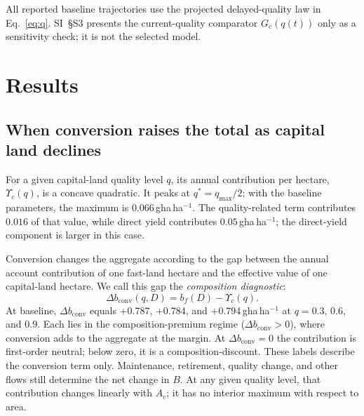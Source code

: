 \documentclass[preprint,12pt,authoryear]{elsarticle}
\newcommand{\dconv}{\Delta b_{\mathrm{conv}}}
\newcommand{\Ups}{\Upsilon_c}
\begin{document}
All reported baseline trajectories use the projected delayed-quality law in Eq.~\eqref{eq:q}. SI~\S S3 presents the current-quality comparator $G_c(q(t))$ only as a sensitivity check; it is not the selected model.
\section{Results}\label{sec:results}

\subsection{When conversion raises the total as capital land declines}\label{sec:mask}

For a given capital-land quality level $q$, its annual contribution per hectare, $\Ups(q)$, is a concave quadratic. It peaks at $q^*=q_{\max}/2$; with the baseline parameters, the maximum is $0.066$\,gha\,ha$^{-1}$. The quality-related term contributes $0.016$ of that value, while direct yield contributes $0.05$\,gha\,ha$^{-1}$; the direct-yield component is larger in this case.

Conversion changes the aggregate according to the gap between the annual account contribution of one fast-land hectare and the effective value of one capital-land hectare. We call this gap the \emph{composition diagnostic}:
\begin{equation}\label{eq:dconv}
\dconv(q,D)=b_f(D)-\Ups(q).
\end{equation}
At baseline, $\dconv$ equals $+0.787$, $+0.784$, and $+0.794$\,gha\,ha$^{-1}$ at $q=0.3$, $0.6$, and $0.9$. Each lies in the composition-premium regime ($\dconv>0$), where conversion adds to the aggregate at the margin. At $\dconv=0$ the contribution is first-order neutral; below zero, it is a composition-discount. These labels describe the conversion term only. Maintenance, retirement, quality change, and other flows still determine the net change in $B$. At any given quality level, that contribution changes linearly with $A_c$; it has no interior maximum with respect to area.
\end{document}
